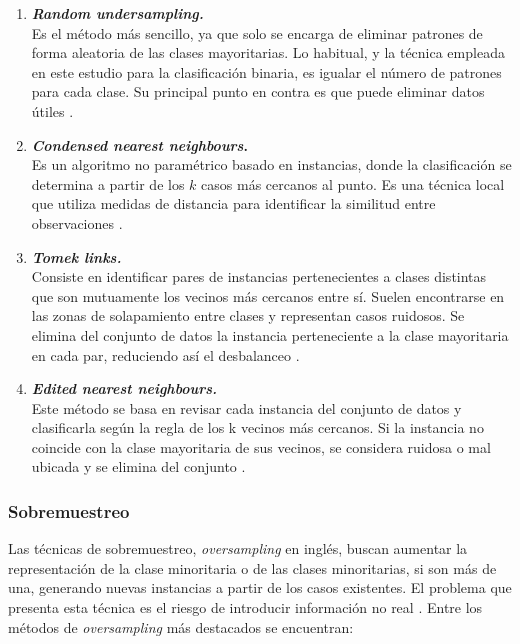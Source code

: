 \begin{enumerate}
	\item \textbf{\textit{Random undersampling.}} \\
		Es el método más sencillo, ya que solo se encarga de eliminar patrones de forma aleatoria de las clases mayoritarias. Lo habitual, y la técnica empleada en este estudio para la clasificación binaria, es igualar el número de patrones para cada clase. Su principal punto en contra es que puede eliminar datos útiles \cite{rundersampling}.
	\item \textbf{\textit{Condensed nearest neighbours}.} \\
		Es un algoritmo no paramétrico basado en instancias, donde la clasificación se determina a partir de los $k$ casos más cercanos al punto. Es una técnica local que utiliza medidas de distancia para identificar la similitud entre observaciones \cite{cnn}.
	\item \textbf{\textit{Tomek links.}} \\
		Consiste en identificar pares de instancias pertenecientes a clases distintas que son mutuamente los vecinos más cercanos entre sí. Suelen encontrarse en las zonas de solapamiento entre clases y representan casos ruidosos. Se elimina del conjunto de datos la instancia perteneciente a la clase mayoritaria en cada par, reduciendo así el desbalanceo \cite{tomeklinks}.
	\item \textbf{\textit{Edited nearest neighbours.}} \\
		Este método se basa en revisar cada instancia del conjunto de datos y clasificarla según la regla de los k vecinos más cercanos. Si la instancia no coincide con la clase mayoritaria de sus vecinos, se considera ruidosa o mal ubicada y se elimina del conjunto \cite{enn}.
\end{enumerate}

\subsubsection{Sobremuestreo}
\label{subsubsec:oversampling}

Las técnicas de sobremuestreo, \textit{oversampling} en inglés, buscan aumentar la representación de la clase minoritaria o de las clases minoritarias, si son más de una, generando nuevas instancias a partir de los casos existentes. El problema que presenta esta técnica es el riesgo de introducir información no real \cite{resamplig}. Entre los métodos de \textit{oversampling} más destacados se encuentran:

